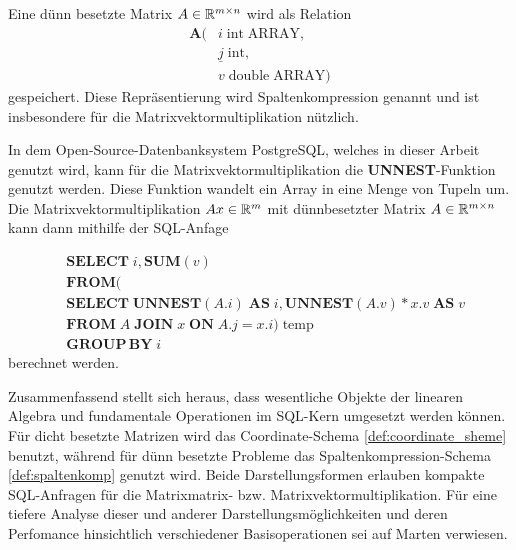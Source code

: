\begin{defi}
    \label{def:spaltenkomp}
Eine dünn besetzte Matrix $A \in \mathbb{R}^{m \times n}$ wird als Relation
\begin{align*}
    \mathbf{A}(&i \; \mathrm{int} \; \mathrm{ARRAY}, \\
               &\underline{j} \; \mathrm{int}, \\
               &v \; \mathrm{double} \; \mathrm{ARRAY}
               )
\end{align*}
gespeichert. Diese Repräsentierung wird Spaltenkompression genannt und ist insbesondere für die Matrixvektormultiplikation nützlich.
\end{defi}
In dem Open-Source-Datenbanksystem PostgreSQL\cite{momjian2001postgresql}, welches in dieser Arbeit genutzt wird, kann für die Matrixvektormultiplikation die \textbf{UNNEST}-Funktion genutzt werden. Diese Funktion wandelt ein Array in eine Menge von Tupeln um. Die Matrixvektormultiplikation $Ax \in \mathbb{R}^m$ mit dünnbesetzter Matrix $A \in \mathbb{R}^{m \times n}$ kann dann mithilfe der SQL-Anfage

\begin{align*}
    &\mathbf{SELECT} \; i, \mathbf{SUM}(v)\\
    &\mathbf{FROM} (\\
    &\mathbf{SELECT} \; \mathbf{UNNEST}(A.i)\; \mathbf{AS} \; i, \mathbf{UNNEST}(A.v)*x.v \; \mathbf{AS} \; v \\
    &\mathbf{FROM} \; A \; \mathbf{JOIN} \; x \; \mathbf{ON} \; A.j=x.i ) \; \text{temp} \\
    &\mathbf{GROUP} \, \mathbf{BY} \; i
\end{align*}
berechnet werden.

Zusammenfassend stellt sich heraus, dass wesentliche Objekte der linearen Algebra und fundamentale Operationen im SQL-Kern umgesetzt werden können. Für dicht besetzte Matrizen wird das Coordinate-Schema \ref{def:coordinate_sheme} benutzt, während für dünn besetzte Probleme das Spaltenkompression-Schema \ref{def:spaltenkomp} genutzt wird. Beide Darstellungsformen erlauben kompakte SQL-Anfragen für die Matrixmatrix- bzw. Matrixvektormultiplikation. Für eine tiefere Analyse dieser und anderer Darstellungsmöglichkeiten und deren Perfomance hinsichtlich verschiedener Basisoperationen sei auf Marten\cite{martendiss} verwiesen.





